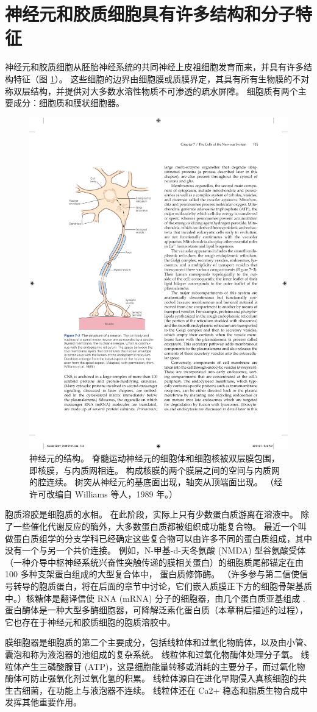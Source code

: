 \section{神经元和胶质细胞具有许多结构和分子特征}
神经元和胶质细胞从胚胎神经系统的共同神经上皮祖细胞发育而来，并具有许多结构特征（图 \ref{fig:7_2}）。 
这些细胞的边界由细胞膜或质膜界定，其具有所有生物膜的不对称双层结构，并提供对大多数水溶性物质不可渗透的疏水屏障。 
细胞质有两个主要成分：细胞质和膜状细胞器。

\begin{figure}[htbp]
	\centering
	\includegraphics[width=0.5\linewidth]{chap07/fig_7_2}
	\caption{神经元的结构。 脊髓运动神经元的细胞体和细胞核被双层膜包围，即核膜，与内质网相连。 构成核膜的两个膜层之间的空间与内质网的腔连续。 树突从神经元的基底面出现，轴突从顶端面出现。 （经许可改编自 Williams 等人，1989 年。）}
	\label{fig:7_2}
\end{figure}


胞质溶胶是细胞质的水相。 
在此阶段，实际上只有少数蛋白质游离在溶液中。 
除了一些催化代谢反应的酶外，大多数蛋白质都被组织成功能复合物。 
最近一个叫做蛋白质组学的分支学科已经确定这些复合物可以由许多不同的蛋白质组成，其中没有一个与另一个共价连接。 
例如，N-甲基-d-天冬氨酸 (NMDA) 型谷氨酸受体（一种介导中枢神经系统兴奋性突触传递的膜相关蛋白）的细胞质尾部锚定在由 100 多种支架蛋白组成的大型复合体中， 蛋白质修饰酶。 
（许多参与第二信使信号转导的胞质蛋白，将在后面的章节中讨论，它们嵌入质膜正下方的细胞骨架基质中。）核糖体是翻译信使 RNA (mRNA) 分子的细胞器，由几个蛋白质亚基组成 . 
蛋白酶体是一种大型多酶细胞器，可降解泛素化蛋白质（本章稍后描述的过程），它也存在于神经元和胶质细胞的胞质溶胶中。


膜细胞器是细胞质的第二个主要成分，包括线粒体和过氧化物酶体，以及由小管、囊泡和称为液泡器的池组成的复杂系统。 
线粒体和过氧化物酶体处理分子氧。 
线粒体产生三磷酸腺苷 (ATP)，这是细胞能量转移或消耗的主要分子，而过氧化物酶体可防止强氧化剂过氧化氢的积累。 
线粒体源自在进化早期侵入真核细胞的共生古细菌，在功能上与液泡器不连续。 
线粒体还在 Ca2+ 稳态和脂质生物合成中发挥其他重要作用。


